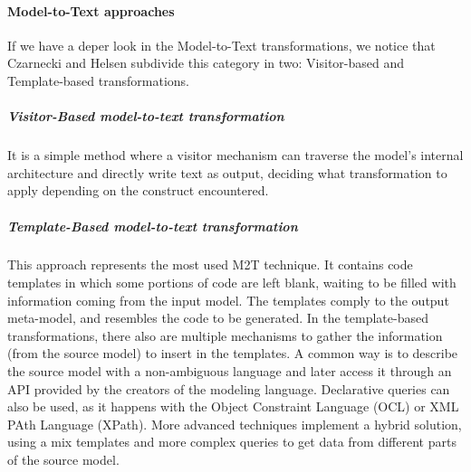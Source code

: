 \paragraph{Model-to-Text approaches}
If we have a deper look in the Model-to-Text transformations, we notice that Czarnecki and Helsen \cite{Czarnecki03classificationof} subdivide this category in two: Visitor-based and Template-based transformations.
\subparagraph{Visitor-Based model-to-text transformation}
It is a simple method where a visitor mechanism can traverse the model's internal architecture and directly write text as output, deciding what transformation to apply depending on the construct encountered. 
\subparagraph{Template-Based model-to-text transformation}
This approach represents the most used M2T technique. It contains code templates in which some portions of code are left blank, waiting to be filled with information coming from the input model. 
The templates comply to the output meta-model, and resembles the code to be generated. 
In the template-based transformations, there also are multiple mechanisms to gather the information (from the source model) to insert in the templates. A common way is to describe the source model with a non-ambiguous language and later access it through an API provided by the creators of the modeling language. Declarative queries can also be used, as it happens with the Object Constraint Language (OCL) or XML PAth Language (XPath). 
More advanced techniques implement a hybrid solution, using a mix templates and more complex queries to get data from different parts of the source model.  
